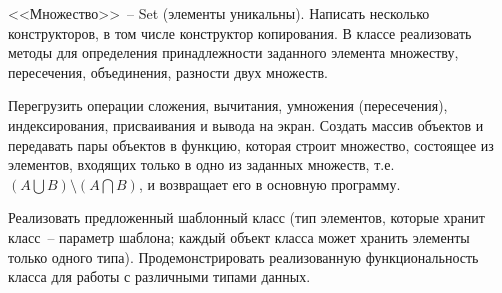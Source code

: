 
<<Множество>>~-- Set (элементы уникальны). Написать несколько конструкторов, в том
числе конструктор копирования. В классе реализовать методы для определения
принадлежности заданного элемента множеству, пересечения, объединения, разности двух
множеств.

Перегрузить операции сложения, вычитания, умножения (пересечения),
индексирования, присваивания и вывода на экран. Создать массив объектов и передавать
пары объектов в функцию, которая строит множество, состоящее из элементов, входящих
только в одно из заданных множеств, т.е. $(A\bigcup B) \setminus (A\bigcap B)$, и возвращает его в основную
программу.

Реализовать предложенный шаблонный класс (тип элементов, которые
хранит класс~-- параметр шаблона; каждый объект класса может хранить
элементы только одного типа). Продемонстрировать реализованную
функциональность класса для работы с различными типами данных.

